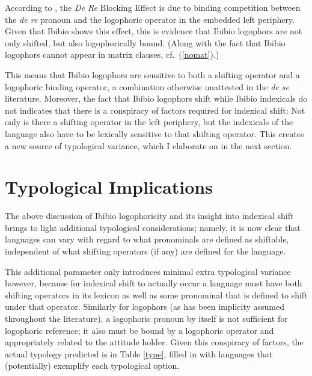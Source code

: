 \documentclass[output=paper]{langscibook}
\begin{document}
According to \citet{Anand2006}, the \textit{De Re} Blocking Effect is due to binding competition between the \textit{de re} pronoun and the logophoric operator in the embedded left periphery. Given that Ibibio shows this effect, this is evidence that Ibibio logophors are not only shifted, but also logophorically bound. (Along with the fact that Ibibio logophors cannot appear in matrix clauses, cf.\ (\ref{nomat}).)

This means that Ibibio logophors are sensitive to both a shifting operator and a logophoric binding operator, a combination otherwise unattested in the \textit{de se} literature. Moreover, the fact that Ibibio logophors shift while Ibibio indexicals do not indicates that there is a conspiracy of factors required for indexical shift: Not only is there a shifting operator in the left periphery, but the indexicals of the language also have to be lexically sensitive to that shifting operator. This creates a new source of typological variance, which I elaborate on in the next section.




\section{Typological Implications}

The above discussion of Ibibio logophoricity and its insight into indexical shift brings to light additional typological considerations; namely, it is now clear that languages can vary with regard to what pronominals are defined as shiftable, independent of what shifting operators (if any) are defined for the language.

This additional parameter only introduces minimal extra typological variance however, because for indexical shift to actually occur a language must have both shifting operators in its lexicon as well as some pronominal that is defined to shift under that operator. Similarly for logophors (as has been implicity assumed throughout the literature), a logophoric pronoun by itself is not sufficient for logophoric reference; it also must be bound by a logophoric operator and appropriately related to the attitude holder. Given this conspiracy of factors, the actual typology predicted is in Table \ref{type}, filled in with languages that (potentially) exemplify each typological option.
\end{document}
